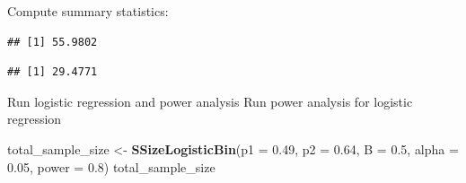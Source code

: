 \documentclass[]{book}
\newenvironment{Shaded}{\begin{snugshade}}{\end{snugshade}}
\newcommand{\DataTypeTok}[1]{\textcolor[rgb]{0.13,0.29,0.53}{#1}}
\newcommand{\FloatTok}[1]{\textcolor[rgb]{0.00,0.00,0.81}{#1}}
\newcommand{\KeywordTok}[1]{\textcolor[rgb]{0.13,0.29,0.53}{\textbf{#1}}}
\newcommand{\NormalTok}[1]{#1}
\newcommand{\OperatorTok}[1]{\textcolor[rgb]{0.81,0.36,0.00}{\textbf{#1}}}
\newcommand{\OtherTok}[1]{\textcolor[rgb]{0.56,0.35,0.01}{#1}}
\newcommand{\StringTok}[1]{\textcolor[rgb]{0.31,0.60,0.02}{#1}}
\begin{document}
\begin{Shaded}
\end{Shaded}

Compute summary statistics:

\begin{Shaded}
\end{Shaded}

\begin{verbatim}
## [1] 55.9802
\end{verbatim}

\begin{Shaded}
\end{Shaded}

\begin{verbatim}
## [1] 29.4771
\end{verbatim}

Run logistic regression and power analysis
Run power analysis for logistic regression

\begin{Shaded}
\begin{Highlighting}[]
\NormalTok{total_sample_size <-}\StringTok{ }\KeywordTok{SSizeLogisticBin}\NormalTok{(}\DataTypeTok{p1 =} \FloatTok{0.49}\NormalTok{,}
                                      \DataTypeTok{p2 =} \FloatTok{0.64}\NormalTok{,}
                                      \DataTypeTok{B =} \FloatTok{0.5}\NormalTok{,}
                                      \DataTypeTok{alpha =} \FloatTok{0.05}\NormalTok{,}
                                      \DataTypeTok{power =} \FloatTok{0.8}\NormalTok{)}
\NormalTok{total_sample_size}
\end{Highlighting}
\end{Shaded}
\end{document}
